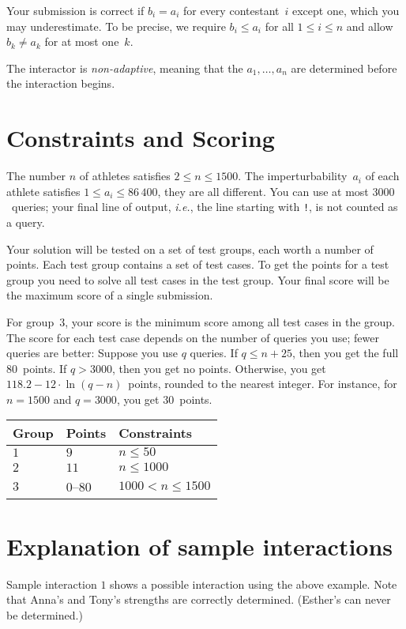Your submission is correct if $b_i=a_i$ for every contestant~$i$ except one, which you may underestimate.
To be precise, we require $b_i\leq a_i$ for all $1\leq i\leq n$ and allow $b_k \neq a_k$ for at most one~$k$.

The interactor is \emph{non-adaptive}, meaning that the $a_1,\ldots, a_n$ are determined before the interaction begins.

\section*{Constraints and Scoring}

The number $n$ of athletes satisfies 
$2\leq n\leq 1500$. %
The imperturbability~$a_i$ of each athlete satisfies 
$1\leq a_i\leq 86\,400$, %
they are all different. %
You can use 
at most $3000$~queries; %
your final line of output, \emph{i.e.}, the line starting with \texttt{!}, is not counted as a query.

Your solution will be tested on a set of test groups, each worth a number of points.
Each test group contains a set of test cases.
To get the points for a test group you need to solve all test cases in the test group.
Your final score will be the maximum score of a single submission.

For group~$3$, your score is the minimum score among all test cases in the group.
The score for each test case depends on the number of queries you use;
fewer queries are better:
Suppose you use $q$ queries. 
If $q \le n+25$, then you get the full $80$~points. 
If $q > 3000$, then you get no points.
Otherwise, you get 
$118.2 - 12 \cdot \ln(q - n)$~points, rounded to the nearest integer. %
For instance, for $n = 1500$ and $q = 3000$, you get $30$~points.

\medskip
\begin{tabular}{lll}
Group & Points & Constraints\\\hline
$1$  &  $9$ & $n\leq 50$\\
$2$  &  $11$ & $n\leq 1000$\\
$3$  &  $0$--$80$ & $1000 < n\leq 1500$\\
\end{tabular}

\section*{Explanation of sample interactions}

Sample interaction $1$ shows a possible interaction using the above example. 
Note that Anna's and Tony's strengths are correctly determined.
(Esther's can never be determined.)
